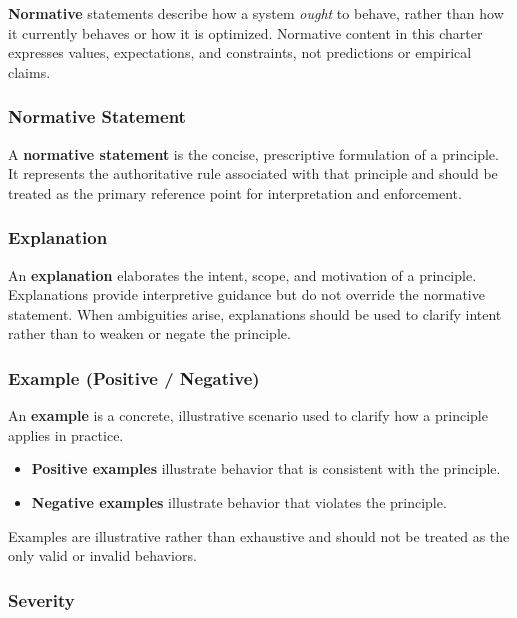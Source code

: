 \documentclass[utf8]{frontiers_suppmat} %
\providecommand{\tightlist}{%
  \setlength{\itemsep}{0pt}\setlength{\parskip}{0pt}}
\begin{document}
\textbf{Normative} statements describe how a system \emph{ought} to
behave, rather than how it currently behaves or how it is optimized.
Normative content in this charter expresses values, expectations, and
constraints, not predictions or empirical claims.

\subsubsection{Normative Statement}\label{normative-statement-10}

A \textbf{normative statement} is the concise, prescriptive formulation
of a principle. It represents the authoritative rule associated with
that principle and should be treated as the primary reference point for
interpretation and enforcement.

\subsubsection{Explanation}\label{explanation-10}

An \textbf{explanation} elaborates the intent, scope, and motivation of
a principle. Explanations provide interpretive guidance but do not
override the normative statement. When ambiguities arise, explanations
should be used to clarify intent rather than to weaken or negate the
principle.

\subsubsection{Example (Positive /
Negative)}\label{example-positive-negative}

An \textbf{example} is a concrete, illustrative scenario used to clarify
how a principle applies in practice.

\begin{itemize}
\tightlist
\item
  \textbf{Positive examples} illustrate behavior that is consistent with
  the principle.
\item
  \textbf{Negative examples} illustrate behavior that violates the
  principle.
\end{itemize}

Examples are illustrative rather than exhaustive and should not be
treated as the only valid or invalid behaviors.

\subsubsection{Severity}\label{severity}
\end{document}
